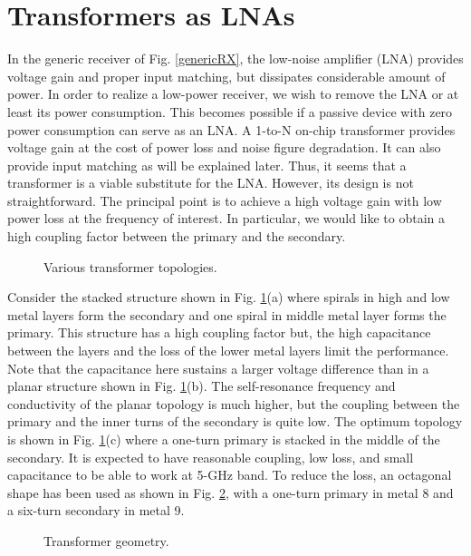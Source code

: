 \section{Transformers as LNAs}
In the generic receiver of Fig. \ref{genericRX}, the low-noise amplifier (LNA) provides voltage gain and proper input matching, but dissipates
considerable amount of power. In order to realize a low-power receiver, we wish to remove the LNA or at least its power consumption. This becomes
possible if a passive device with zero power consumption can serve as an LNA. A 1-to-N on-chip transformer provides voltage gain at the cost of power
loss and noise figure degradation. It can also provide input matching as will be explained later. Thus, it seems that a transformer is a viable
substitute for the LNA. However, its design is not straightforward. The principal point is to achieve a high voltage gain with low power loss at the
frequency of interest. In particular, we would like to obtain a high coupling factor between the primary and the secondary. 
\begin{figure}[htb]
\vspace{4.6in}
\caption{Various transformer topologies.}
\label{Transformer_topologies}
\end{figure}
Consider the stacked structure \cite{Zolfaghari2} shown in Fig. \ref{Transformer_topologies}(a) where spirals in high and low metal layers form the
secondary and one spiral in middle metal layer forms the primary. This structure has a high coupling factor but, the high capacitance between the
layers and the loss of the lower metal layers limit the performance. Note that the capacitance here sustains a larger voltage difference than in a
planar structure \cite{Long} shown in Fig. \ref{Transformer_topologies}(b). The self-resonance frequency and conductivity of the planar topology is
much higher, but the coupling between the primary and the inner turns of the secondary is quite low. The optimum topology is shown in Fig.
\ref{Transformer_topologies}(c) where a one-turn primary is stacked in the middle of the secondary. It is expected to have reasonable coupling, low
loss, and small capacitance to be able to work at 5-GHz band. To reduce the loss, an octagonal shape has been used as shown in Fig.
\ref{transformer}, with a one-turn primary in metal 8 and a six-turn secondary in metal 9.
\begin{figure}[htb]
\vspace{2.3in}
\caption{Transformer geometry.}
\label{transformer}
\end{figure}
